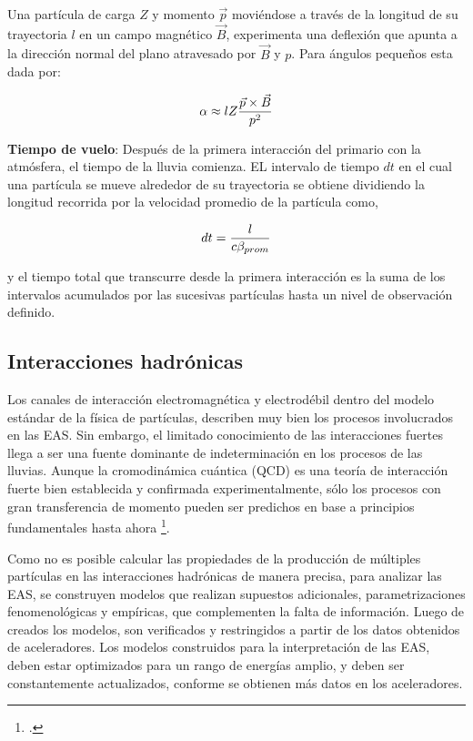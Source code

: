 Una partícula de carga $Z$ y momento $\Vec{p}$ moviéndose a través de la longitud de su trayectoria $l$ en un campo magnético $\Vec{B}$, experimenta una deflexión que apunta a la dirección normal del plano atravesado por $\Vec{B}$ y $p$. Para ángulos pequeños esta dada por:

\begin{equation}
\centering
\alpha \approx lZ \frac{\Vec{p} \times \Vec{B}}{p^{2}}
\label{eq:eq23}
\end{equation}

\textbf{Tiempo de vuelo}: Después de la primera interacción del primario con la atmósfera, el tiempo de la lluvia comienza. EL intervalo de tiempo $dt$ en el cual una partícula se mueve alrededor de su trayectoria se obtiene dividiendo la longitud recorrida por la velocidad promedio de la partícula como,

\begin{equation}
\centering
dt = \frac{l}{c\beta_{prom}}
\label{eq:eq24}
\end{equation}

y el tiempo total que transcurre desde la primera interacción es la suma de los intervalos acumulados por las sucesivas partículas hasta un nivel de observación definido.

\subsection{Interacciones hadr\'onicas}

Los canales de interacción electromagnética y electrodébil dentro del modelo estándar de la física de partículas, describen muy bien los procesos involucrados en las EAS. Sin embargo, el limitado conocimiento de las interacciones fuertes llega a ser una fuente dominante de indeterminación en los procesos de las lluvias. Aunque la cromodinámica cuántica (QCD) es una teoría de interacción fuerte bien establecida y confirmada experimentalmente, sólo los procesos con gran transferencia de momento pueden ser predichos en base a principios fundamentales hasta ahora \footcite[][]{Allen}. 

Como no es posible calcular las  propiedades de la producción de múltiples partículas en las interacciones hadrónicas de manera precisa, para analizar las EAS, se construyen modelos que realizan supuestos adicionales, parametrizaciones fenomenológicas y empíricas, que complementen la falta de información. Luego de creados los modelos, son verificados y restringidos a partir de los datos obtenidos de aceleradores. Los modelos construidos para la interpretación de las EAS, deben estar optimizados para un rango de energías amplio, y deben ser constantemente actualizados, conforme se obtienen más datos en los aceleradores.

